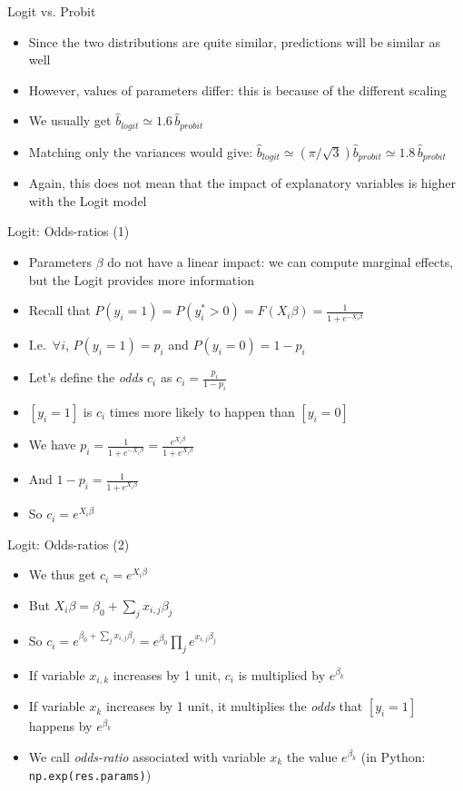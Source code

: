 \documentclass[aspectratio=169]{beamer}
\begin{document}
\begin{frame}{Logit vs. Probit}
\begin{itemize}
    \item Since the two distributions are quite similar, predictions will be similar as well
    \item However, values of parameters differ: this is because of the different scaling
    \item We usually get $\hat{b}_{logit} \simeq 1.6\, \hat{b}_{probit}$
    \item Matching only the variances would give: $\hat{b}_{logit} \simeq (\pi/\sqrt{3}) \hat{b}_{probit} \simeq 1.8\, \hat{b}_{probit}$
    \item Again, this does not mean that the impact of explanatory variables is higher with the Logit model
\end{itemize}
\end{frame}

\begin{frame}{Logit: Odds-ratios (1)}
\begin{itemize}
    \item Parameters $\beta$ do not have a linear impact: we can compute marginal effects, but the Logit provides more information
    \item Recall that $P(y_i = 1) = P(y_i^* > 0) = F(X_i\beta) = \frac{1}{1+e^{-X_i\beta}}$
    \item I.e.\ $\forall i$, $P(y_i = 1) = p_i$ and $P(y_i = 0) = 1 - p_i$
    \item Let's define the \textit{odds} $c_i$ as $c_i = \frac{p_i}{1-p_i}$
    \item $[y_i = 1]$ is $c_i$ times more likely to happen than $[y_i = 0]$
    \item We have $p_i = \frac{1}{1+e^{-X_i\beta}} = \frac{e^{X_i\beta}}{1+e^{X_i\beta}}$
    \item And $1 - p_i = \frac{1}{1+e^{X_i\beta}}$
    \item So $c_i = e^{X_i\beta}$
\end{itemize}
\end{frame}

\begin{frame}{Logit: Odds-ratios (2)}
\begin{itemize}
    \item We thus get $c_i = e^{X_i\beta}$
    \item But $X_i\beta = \beta_0 + \sum_j x_{i,j}\beta_j$
    \item So $c_i = e^{\beta_0 + \sum_j x_{i,j}\beta_j} = e^{\beta_0}\prod_j e^{x_{i,j}\beta_j}$
    \item If variable $x_{i,k}$ increases by 1 unit, $c_i$ is multiplied by $e^{\beta_k}$
    \item If variable $x_k$ increases by 1 unit, it multiplies the \textit{odds} that $[y_i = 1]$ happens by $e^{\beta_k}$
    \item We call \textit{odds-ratio} associated with variable $x_k$ the value $e^{\beta_k}$ (in Python: \texttt{np.exp(res.params)})
\end{itemize}
\end{frame}
\end{document}
